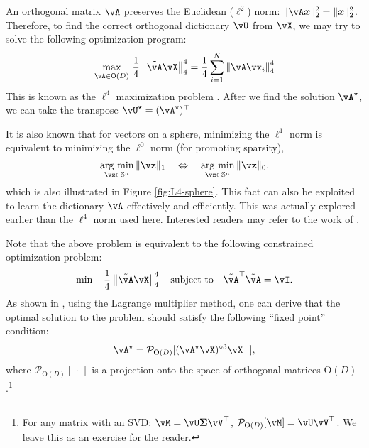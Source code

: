 \documentclass[\toplevelprefix/book-main.tex]{subfiles}
\begin{document}
An orthogonal matrix $\vA$ preserves the Euclidean (\(\ell^{2}\)) norm: $\|\vA \x\|_2^2 = \|\x\|_2^2$. Therefore, to find the correct orthogonal dictionary $\vU$ from $\vX$, we may try to solve the following optimization program:
\begin{equation}\label{eq0:orthogonal-dictionary-learning-l4}
    \max_{\tilde{\vA} \in \O(D)}\,
     \frac{1}{4} \norm*{
    \tilde{\vA} \vX
    }_4^4 =  \frac{1}{4} \sum_{i=1}^N \norm*{
    \vA \vx_i
    }_4^4
\end{equation}
This is known as the $\ell^4$ maximization problem \cite{Zhai-2020}. After we
find the solution \(\vA^{\star}\), we can take the transpose \(\vU^{\star}
= (\vA^{\star})^{\top}\)
\begin{remark}
    It is also known that for vectors on a sphere, minimizing the $\ell^1$ norm is equivalent to minimizing the $\ell^0$ norm (for promoting sparsity),
\begin{equation*}
            \argmin_{\vz \in \mathbb{S}^n}\|\vz\|_{1}\quad\Leftrightarrow\quad \argmin_{\vz \in \mathbb{S}^n}\|\vz\|_{0},
\end{equation*}
which is also illustrated in Figure \ref{fig:L4-sphere}. This fact can also be exploited to learn the dictionary $\vA$ effectively and efficiently. This was actually explored earlier than the $\ell^4$ norm used here. Interested readers may refer to the work of \cite{qu2020findingsparsestvectorssubspace}.
\end{remark}

Note that the above problem is equivalent to the following constrained optimization problem:
\begin{equation}\label{eq:orthogonal-dictionary-learning-l4}
    \min\,
    -   \frac{1}{4} \norm*{
    \tilde{\vA} \vX
    }_4^4 \quad \mbox{subject to} \quad  \tilde{\vA}^\top\tilde{\vA} = \vI.
\end{equation}
As shown in \cite{Wright-Ma-2022}, using the Lagrange multiplier method, one can derive that the optimal solution to the problem should satisfy the following 
``fixed point'' condition:
\begin{equation}
    \vA^{\star} = \mathcal{P}_{\mathrm O(D)}[( {\vA^{\star} \vX})^{\circ3}\vX^\top],
\end{equation}
where $\mathcal{P}_{\mathrm O(D)}[\,\cdot\,]$ is a projection onto the space of orthogonal matrices $\mathrm O(D)$.\footnote{For any matrix with an SVD: $\vM = \vU\bm \Sigma \vV^\top$, $\mathcal{P}_{\mathrm O(D)}[\vM] = \vU \vV^\top$. We leave this as an exercise for the reader.} 
\end{document}
